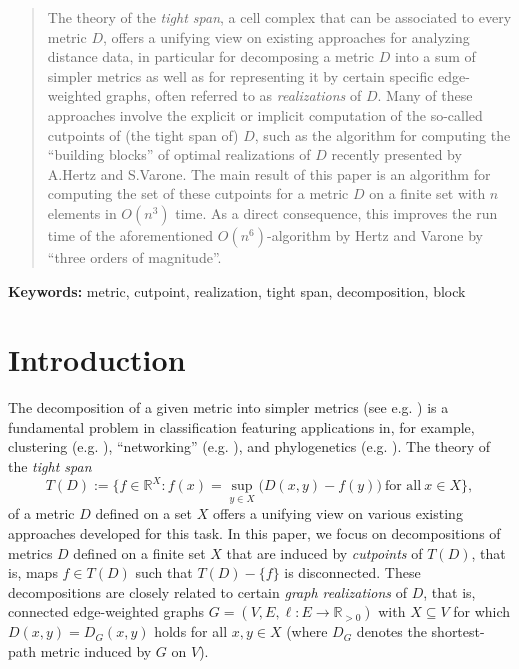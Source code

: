 \documentclass[12pt]{article}
\begin{document}
\begin{abstract}
The theory of the {\em tight span}, a  
cell complex 
that can be associated to every metric \(D\), 
offers a unifying view on existing approaches
for analyzing distance data, in particular 
for decomposing a
metric \(D\) 
into a sum of simpler metrics
as well as for representing it
by certain specific edge-weighted graphs,
often referred to as 
{\em realizations} of \(D\).
Many of these approaches involve the explicit or implicit
computation of the so-called cutpoints of 
(the tight span of) \(D\),
such as the algorithm for computing the
``building blocks'' of
optimal realizations of $D$ recently presented by A.Hertz and S.Varone.
The main result of this paper is an algorithm for computing
the set of these cutpoints for a metric \(D\) on a finite
set with \(n\) elements in $O(n^3)$ time.
As a direct consequence, this improves the run time of the aforementioned
$O(n^6)$-algorithm by Hertz and Varone by ``three orders of magnitude''.
\end{abstract}

\noindent
\textbf{Keywords:} metric, cutpoint, realization, tight span, decomposition, block

\section{Introduction}
\label{section:introduction}


The decomposition of a given metric into simpler metrics 
(see e.g. \cite{deza:laurent:cuts:1997})
is a fundamental problem in classification featuring  applications in, for example, 
clustering (e.g. \cite{bryant:berry:clustering:2001}), 
``networking'' (e.g. \cite{chu-gar-gra-01a}), and 
phylogenetics (e.g. \cite{huson:bryant:networks2005}). 
The theory of the \emph{tight span} \[
T(D) := \{f \in \mathbb{R}^X :
f(x) = \underset{y \in X}{\sup} \big(D(x,y)-f(y)\big) \ 
\text{for all} \ x \in X\},
\]
of a metric \(D\) defined on a set \(X\) \cite{isbell:six:theorems:1964,dress:tight:extensions:1984}
offers a unifying view on various existing approaches developed for 
this task. 
In this paper, we focus on decompositions of metrics \(D\) 
defined on a finite set $X$ that are induced by \emph{cutpoints} of \(T(D)\), that is, maps \(f \in T(D)\) 
such that \(T(D)-\{f\}\) is disconnected. These decompositions
are closely related to  certain \emph{graph realizations} of \(D\),
that is, connected edge-weighted graphs \(G = (V,E,\ell: E \rightarrow \mathbb{R}_{>0})\) with \(X \subseteq V\) 
for which \(D(x,y) = D_G(x,y)\) holds for all \(x,y \in X\) (where \(D_G\) denotes the shortest-path metric induced by \(G\) on \(V\)).
\end{document}
